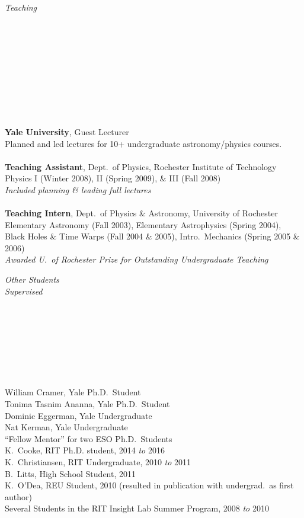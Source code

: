 \documentclass[11pt]{article}
\begin{document}
\hspace{2.5mm} \parbox{1.5in}{{\it Teaching \\\\\\\\\\\\\\\\\\\\}} \parbox{5.15in}{
{\bf Yale University}, Guest Lecturer\\
Planned and led lectures for 10+ undergraduate astronomy/physics courses. \\
\\
{\bf Teaching Assistant}, Dept.~of Physics, Rochester Institute of Technology \\
Physics I (Winter 2008), II (Spring 2009), \& III (Fall 2008) \\
{\it Included planning \& leading full lectures}\\
\\
{\bf Teaching Intern}, Dept.~of Physics \& Astronomy, University of Rochester \\
Elementary Astronomy (Fall 2003), Elementary Astrophysics (Spring 2004), 
Black Holes \& Time Warps (Fall 2004 \& 2005), Intro.~Mechanics (Spring 2005 \& 2006) \\ {\it Awarded U.~of Rochester Prize for Outstanding Undergraduate Teaching}}




\vspace{4mm}


\hspace{2.5mm} \parbox{1.5in}{{\it Other Students \\ Supervised \\\\\\\\\\\\\\\\}} \parbox{5.15in}{
William Cramer, Yale Ph.D.~Student\\
Tonima Tasnim Ananna, Yale Ph.D.~Student\\
Dominic Eggerman, Yale Undergraduate \\
Nat Kerman, Yale Undergraduate\\
``Fellow Mentor'' for two ESO Ph.D.~Students \\ 
K.~Cooke, RIT Ph.D. student, 2014 \textit{to} 2016 \\
K.~Christiansen, RIT Undergraduate, 2010 {\it to} 2011 \\ B.~Litts, High School Student, 2011 \\ K.~O'Dea, REU Student, 2010 (resulted in publication with undergrad.~as first author)  \\  Several Students in the RIT Insight Lab Summer Program, 2008 {\it to} 2010}\\
\end{document}
